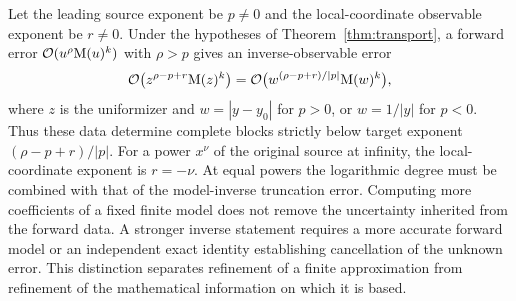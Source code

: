 Let the leading source exponent be $p\ne0$ and the local-coordinate
observable exponent be $r\ne0$. Under the hypotheses of
Theorem~\ref{thm:transport}, a forward error
$\mathcal O(u^\rho\mathrm M(u)^k)$ with $\rho>p$ gives an inverse-observable error
\[
 \mathcal O\bigl(z^{\rho-p+r}\mathrm M(z)^k\bigr)
 =\mathcal O\bigl(w^{(\rho-p+r)/|p|}\mathrm M(w)^k\bigr),
\]
where $z$ is the uniformizer and $w=|y-y_0|$ for $p>0$, or
$w=1/|y|$ for $p<0$. Thus these data determine complete blocks strictly
below target exponent $(\rho-p+r)/|p|$. For a power $x^\nu$ of the
original source at infinity, the local-coordinate exponent is $r=-\nu$.
At equal powers the logarithmic degree must be combined with that of the
model-inverse truncation error. Computing more coefficients of a fixed
finite model does not remove the uncertainty inherited from the forward
data. A stronger inverse statement requires a more accurate forward model
or an independent exact identity establishing cancellation of the unknown
error. This distinction separates refinement of a finite approximation
from refinement of the mathematical information on which it is based.
